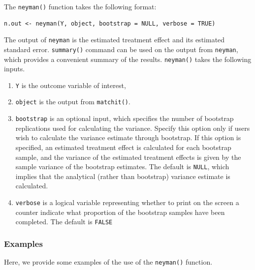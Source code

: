 \documentclass[oneside,letterpaper,titlepage]{article}
\begin{document}
The {\tt neyman()} function takes the following format:
\begin{verbatim}
n.out <- neyman(Y, object, bootstrap = NULL, verbose = TRUE)
\end{verbatim}
The output of {\tt neyman} is the estimated treatment effect and its
estimated standard error.  {\tt summary()} command can be used on the
output from {\tt neyman}, which provides a convenient summary of the
results. {\tt neyman()} takes the following inputs.

\begin{enumerate}
\item {\tt Y} is the outcome variable of interest, 
\item {\tt object} is the output from {\tt matchit()}.
\item {\tt bootstrap} is an optional input, which specifies the number
  of bootstrap replications used for calculating the variance. Specify
  this option only if users wish to calculate the variance estimate
  through bootstrap. If this option is specified, an estimated
  treatment effect is calculated for each bootstrap sample, and the
  variance of the estimated treatment effects is given by the sample
  variance of the bootstrap estimates. The default is {\tt NULL},
  which implies that the analytical (rather than bootstrap) variance
  estimate is calculated.
\item {\tt verbose} is a logical variable representing whether to
  print on the screen a counter indicate what proportion of the
  bootstrap samples have been completed. The default is {\tt FALSE}
\end{enumerate}

\subsubsection{Examples}

Here, we provide some examples of the use of the {\tt neyman()}
function.
\end{document}
